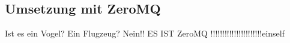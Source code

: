 \subsection{Umsetzung mit ZeroMQ}
Ist es ein Vogel? Ein Flugzeug? Nein!! ES IST ZeroMQ !!!!!!!!!!!!!!!!!!!!!!einself